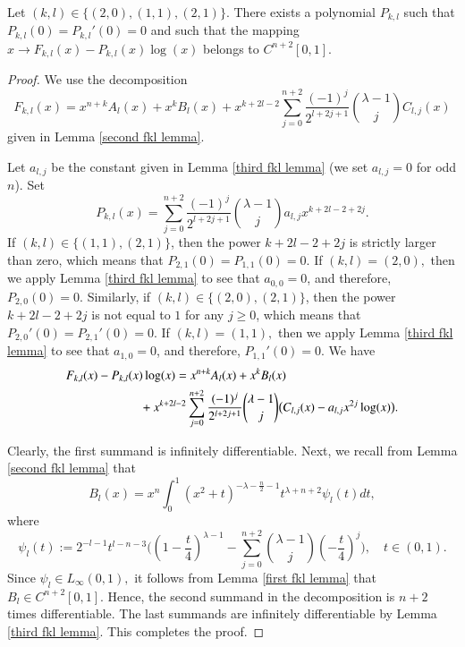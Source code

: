 \documentclass[12pt]{amsart}
\begin{document}
\begin{lemma}\label{fifth fkl lemma} Let $(k,l)\in\{(2,0),(1,1),(2,1)\}.$ There exists a polynomial $P_{k,l}$ such that $P_{k,l}(0)=P_{k,l}'(0)=0$ and such that the mapping $x\to F_{k,l}(x)-P_{k,l}(x)\log(x)$ belongs to $C^{n+2}[0,1].$
\end{lemma}
\begin{proof} We use the decomposition
$$F_{k,l}(x)=x^{n+k}A_l(x)+x^kB_l(x)+x^{k+2l-2}\sum_{j=0}^{n+2}\frac{(-1)^j}{2^{l+2j+1}}\binom{\lambda-1}{j}C_{l,j}(x)$$
given in Lemma \ref{second fkl lemma}.

Let $a_{l,j}$ be the constant given in Lemma \ref{third fkl lemma} (we set $a_{l,j}=0$ for odd $n$). Set
$$P_{k,l}(x)=\sum_{j=0}^{n+2}\frac{(-1)^j}{2^{l+2j+1}}\binom{\lambda-1}{j}a_{l,j}x^{k+2l-2+2j}.$$
{\color{blue}If $(k,l)\in\{(1,1),(2,1)\}$, then the power $k+2l-2+2j$ is strictly larger  than zero, which means that $P_{2,1}(0)=P_{1,1}(0)=0$. If $(k,l)=(2,0),$ then we apply Lemma \ref{third fkl lemma} to see that $a_{0,0}=0$, and therefore,
$P_{2,0}(0)=0.$ Similarly, if $(k,l)\in\{(2,0),(2,1)\}$, then the power $k+2l-2+2j$ is not equal to $1$ for any $j\geq 0$, which means that $P_{2,0}'(0)=P_{2,1}'(0)=0$. If $(k,l)=(1,1),$ then we apply Lemma \ref{third fkl lemma} to see that $a_{1,0}=0$, and therefore,
$P_{1,1}'(0)=0$.
} We have
\begin{align*}
F_{k,l}(x)-P_{k,l}(x)\log(x)&=x^{n+k}A_l(x)+x^kB_l(x)\\
&\hspace{-1.0cm}+x^{k+2l-2}\sum_{j=0}^{n+2}\frac{(-1)^j}{2^{l+2j+1}}\binom{\lambda-1}{j}\big(C_{l,j}(x)-a_{l,j}x^{2j}\log(x)\big).
\end{align*}

Clearly, the first summand is infinitely differentiable. Next, we recall from Lemma \ref{second fkl lemma} that
$$B_l(x)=x^n\int_0^1(x^2+t)^{-\lambda-\frac{n}{2}-1}t^{\lambda+n+2}\psi_l(t)dt,$$
where
$$\psi_l(t):=2^{-l-1}t^{l-n-3}\Big((1-\frac{t}{4})^{\lambda-1}-\sum_{j=0}^{n+2}\binom{\lambda-1}{j}(-\frac{t}{4})^j\Big),\quad t\in(0,1).$$
Since $\psi_l\in L_{\infty}(0,1),$ it follows from Lemma \ref{first fkl lemma} that $B_l\in C^{n+2}[0,1].$ Hence, the second summand in the decomposition is  $n+2$ times differentiable.
 The last summands are infinitely differentiable by Lemma \ref{third fkl lemma}. This completes the proof.
\end{proof}
\end{document}
